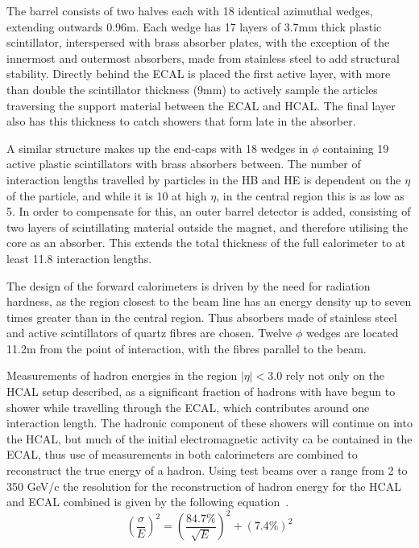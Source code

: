 The barrel consists of two halves each with 18 identical azimuthal wedges, extending outwards 0.96m. Each wedge has 17 layers of 3.7mm thick plastic scintillator, interspersed with brass absorber plates, with the exception of the innermost and outermost absorbers, made from stainless steel to add structural stability. Directly behind the ECAL is placed the first active layer, with more than double the scintillator thickness (9mm) to actively sample the articles traversing the support material between the ECAL and HCAL. The final layer also has this thickness to catch showers that form late in the absorber. 

A similar structure makes up the end-caps with 18 wedges in $\phi$ containing 19 active plastic scintillators with brass absorbers between. The number of interaction lengths travelled by particles in the HB and HE is dependent on the $\eta$ of the particle, and while it is 10 at high $\eta$, in the central region this is as low as 5. In order to compensate for this, an outer barrel detector is added, consisting of two layers of scintillating material outside the magnet, and therefore utilising the core as an absorber. This extends the total thickness of the full calorimeter to at least 11.8 interaction lengths. 

The design of the forward calorimeters is driven by the need for radiation hardness, as the region closest to the beam line has an energy density up to seven times greater than in the central region. Thus absorbers made of stainless steel and active scintillators of quartz fibres are chosen. Twelve $\phi$ wedges are located 11.2m from the point of interaction, with the fibres parallel to the beam.

Measurements of hadron energies in the region $| \eta| < 3.0$ rely not only on the HCAL setup described, as a significant fraction of hadrons with have begun to shower while travelling through the ECAL, which contributes around one interaction length.  The hadronic component of these showers will continue on into the HCAL, but much of the initial electromagnetic activity ca be contained in the ECAL, thus use of measurements in both calorimeters are combined to reconstruct the true energy of a hadron. Using test beams over a range from 2 to 350 GeV/c the resolution for the reconstruction of hadron energy for the HCAL and ECAL combined is given by the following equation~\cite{HCALTestBeam}.
\begin{equation} 
\left(\frac{\sigma}{E}\right)^2 = \left(\frac{84.7\%}{\sqrt{E}}\right)^2 + \left(7.4\% \right)^2 
\label{eq:H-Res}
\end{equation}





